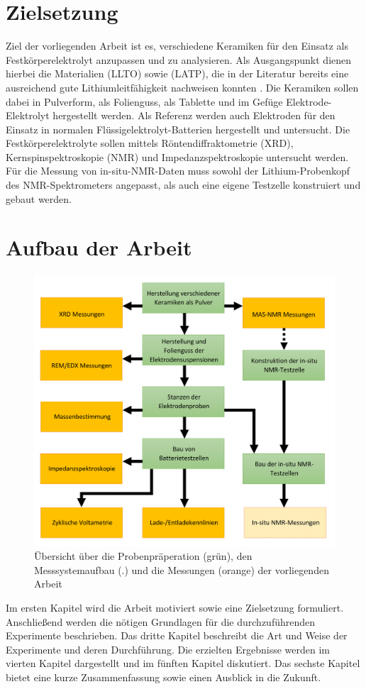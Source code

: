 \documentclass[a4paper, 11pt, headsepline,footsepline,twoside,abstract]{scrbook}
\begin{document}
\section{Zielsetzung}
Ziel der vorliegenden Arbeit ist es, verschiedene Keramiken für den Einsatz als Festkörperelektrolyt anzupassen und zu analysieren. Als Ausgangspunkt dienen hierbei die Materialien  (LLTO) sowie  (LATP), die in der Literatur bereits eine ausreichend gute Lithiumleitfähigkeit nachweisen konnten \cite{tatsumisago2013recent}. Die Keramiken sollen dabei in Pulverform, als Folienguss, als Tablette und im Gefüge Elektrode-Elektrolyt hergestellt werden. Als Referenz werden auch Elektroden für den Einsatz in normalen Flüssigelektrolyt-Batterien hergestellt und untersucht. Die Festkörperelektrolyte sollen mittels Röntendiffraktometrie (XRD), Kernspinspektroskopie (NMR) und Impedanzspektroskopie untersucht werden. Für die Messung von in-situ-NMR-Daten muss sowohl der Lithium-Probenkopf des NMR-Spektrometers angepasst, als auch eine eigene Testzelle konstruiert und gebaut werden.
\section{Aufbau der Arbeit}
\begin{figure}
	\centering
	\includegraphics[width=1.0\columnwidth]{images/Flowchart_Masterarbeit2.png}
	\caption{Übersicht über die Probenpräperation (grün), den Messsystemaufbau (.) und die Messungen (orange) der vorliegenden Arbeit}
	\label{Flowchart_Masterarbeit}
\end{figure}
Im ersten Kapitel wird die Arbeit motiviert sowie eine Zielsetzung formuliert. Anschließend werden die nötigen Grundlagen für die durchzuführenden Experimente beschrieben. Das dritte Kapitel beschreibt die Art und Weise der Experimente und deren Durchführung. Die erzielten Ergebnisse werden im vierten Kapitel dargestellt und im fünften Kapitel diskutiert. Das sechste Kapitel bietet eine kurze Zusammenfassung sowie einen Ausblick in die Zukunft.
\end{document}
